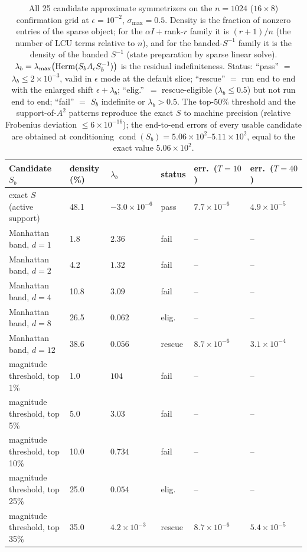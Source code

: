 \begin{table}
\caption{All 25 candidate approximate symmetrizers on the $n=1024$
($16\times8$) confirmation grid at $\epsilon=10^{-2}$,
$\sigma_{\max}=0.5$.  Density is the fraction of nonzero entries of
the sparse object; for the $\alpha I+{}$rank-$r$ family it is
$(r{+}1)/n$ (the number of LCU terms relative to $n$), and for the
banded-$S^{-1}$ family it is the density of the banded $S^{-1}$ (state
preparation by sparse linear solve).
$\lambda_b=\lambda_{\max}\bigl(\mathrm{Herm}(S_bA_\epsilon S_b^{-1})\bigr)$ is
the residual indefiniteness.  Status: ``pass'' $=$
$\lambda_b\le2\times10^{-3}$, valid in $\epsilon$ mode at the default
slice; ``rescue'' $=$ run end to end with the enlarged shift
$\epsilon+\lambda_b$; ``elig.''\ $=$ rescue-eligible
($\lambda_b\le0.5$) but not run end to end; ``fail'' $=$ $S_b$
indefinite or $\lambda_b>0.5$.  The top-$50\%$ threshold and the
support-of-$A^{2}$ patterns reproduce the exact $S$ to machine
precision (relative Frobenius deviation $\le6\times10^{-16}$); the
end-to-end errors of every usable candidate are obtained at
conditioning $\operatorname{cond}(S_b)=5.06\times10^{2}$--$5.11
\times10^{2}$, equal to the exact value $5.06\times10^{2}$.}
\label{ch3:appE:tab:compress}
\begin{tabular}{llllll}
\toprule
Candidate $S_b$ & density (\%) & $\lambda_b$ & status &
err.\ ($T{=}10$) & err.\ ($T{=}40$) \\
\midrule
exact $S$ (active support) & 48.1 & $-3.0\times10^{-6}$ & pass & $7.7\times10^{-6}$ & $4.9\times10^{-5}$ \\
Manhattan band, $d=1$ & 1.8 & $2.36$ & fail & -- & -- \\
Manhattan band, $d=2$ & 4.2 & $1.32$ & fail & -- & -- \\
Manhattan band, $d=4$ & 10.8 & $3.09$ & fail & -- & -- \\
Manhattan band, $d=8$ & 26.5 & $0.062$ & elig. & -- & -- \\
Manhattan band, $d=12$ & 38.6 & $0.056$ & rescue & $8.7\times10^{-6}$ & $3.1\times10^{-4}$ \\
magnitude threshold, top 1\% & 1.0 & $104$ & fail & -- & -- \\
magnitude threshold, top 5\% & 5.0 & $3.03$ & fail & -- & -- \\
magnitude threshold, top 10\% & 10.0 & $0.734$ & fail & -- & -- \\
magnitude threshold, top 25\% & 25.0 & $0.054$ & elig. & -- & -- \\
magnitude threshold, top 35\% & 35.0 & $4.2\times10^{-3}$ & rescue & $8.7\times10^{-6}$ & $5.4\times10^{-5}$ \\

\end{tabular}
\end{table}
